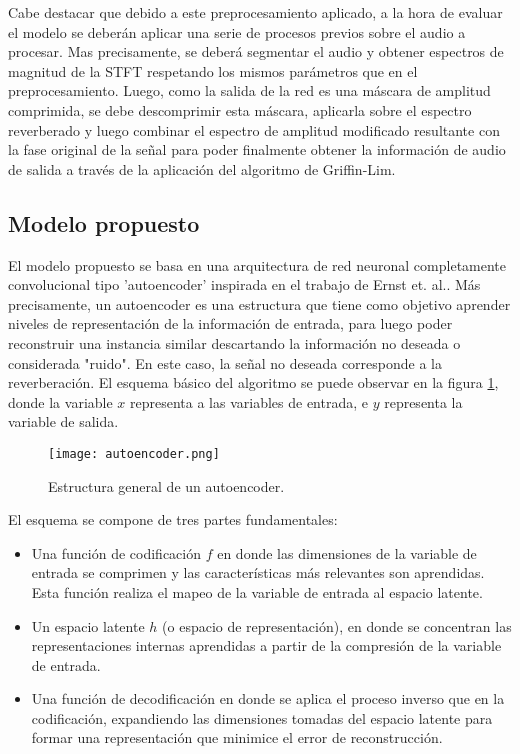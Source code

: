 Cabe destacar que debido a este preprocesamiento aplicado, a la hora de evaluar el modelo se deberán aplicar una serie de procesos previos sobre el audio a procesar. Mas precisamente, se deberá segmentar el audio y obtener espectros de magnitud de la STFT respetando los mismos parámetros que en el preprocesamiento. Luego, como la salida de la red es una máscara de amplitud comprimida, se debe descomprimir esta máscara, aplicarla sobre el espectro reverberado y luego combinar el espectro de amplitud modificado resultante con la fase original de la señal para poder finalmente obtener la información de audio de salida a través de la aplicación del algoritmo de Griffin-Lim.  


\subsection{Modelo propuesto}

El modelo propuesto se basa en una arquitectura de red neuronal completamente convolucional tipo 'autoencoder' inspirada en el trabajo de Ernst et. al.\cite{FCN}. Más precisamente, un autoencoder es una estructura que tiene como objetivo aprender niveles de representación de la información de entrada, para luego poder reconstruir una instancia similar descartando la información no deseada o considerada "ruido". En este caso, la señal no deseada corresponde a la reverberación. El esquema básico del algoritmo se puede observar en la figura \ref{fig:autoencoder}, donde la variable $x$ representa a las variables de entrada, e $y$ representa la variable de salida. 

\begin{figure}[H]
	\centering{}
	\texttt{[image: autoencoder.png]}
	\caption{Estructura general de un autoencoder.}
	\label{fig:autoencoder}
\end{figure}

El esquema se compone de tres partes fundamentales: 
\begin{itemize}
\item Una función de codificación $f$ en donde las dimensiones de la variable de entrada se comprimen y las características más relevantes son aprendidas. Esta función realiza el mapeo de la variable de entrada al espacio latente. 
\item Un espacio latente $h$ (o espacio de representación), en donde se concentran las representaciones internas aprendidas a partir de la compresión de la variable de entrada. 
\item Una función de decodificación en donde se aplica el proceso inverso que en la codificación, expandiendo las dimensiones tomadas del espacio latente para formar una representación que minimice el error de reconstrucción. 

\end{itemize}

